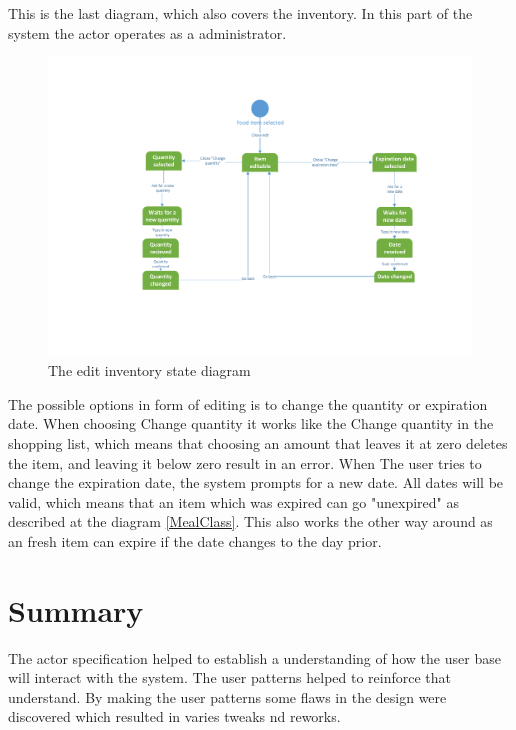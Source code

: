 This is the last diagram, which also covers the inventory. In this part of the system the actor operates as a administrator.

\begin{figure}[H]
	\centering
	\includegraphics[width=1.0\textwidth]{ApplicationDomain/spEditInventory.pdf} 
	\caption{The edit inventory state diagram}
	\label{spEditInventory}
\end{figure}
The possible options in form of editing is to change the quantity or expiration date. 
When choosing Change quantity it works like the Change quantity in the shopping list, which means that choosing an amount that leaves it at zero deletes the item, and leaving it below zero result in an error. When The user tries to change the expiration date, the system prompts for a new date. All dates will be valid, which means that an item which was expired can go "unexpired" as described at the diagram \ref{MealClass}. This also works the other way around as an fresh item can expire if the date changes to the day prior.


\section*{Summary}
The actor specification helped to establish a understanding of how the user base will interact with the system. The user patterns helped to reinforce that understand. By making the user patterns some flaws in the design were discovered which resulted in varies tweaks nd reworks.